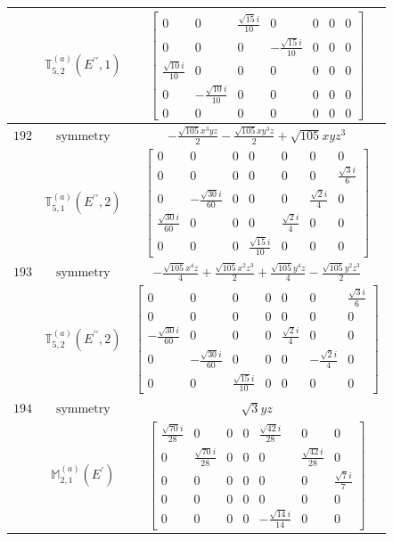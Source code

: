 \documentclass[fleqn,8pt,landscape]{jsarticle}
\begin{document}
\begin{longtable}{ccc}
$  $ & $ \mathbb{T}_{5,2}^{(a)}(E^{\prime\prime},1) $ & $ \begin{bmatrix} 0 & 0 & \frac{\sqrt{15} i}{10} & 0 & 0 & 0 & 0 \\ 0 & 0 & 0 & - \frac{\sqrt{15} i}{10} & 0 & 0 & 0 \\ \frac{\sqrt{10} i}{10} & 0 & 0 & 0 & 0 & 0 & 0 \\ 0 & - \frac{\sqrt{10} i}{10} & 0 & 0 & 0 & 0 & 0 \\ 0 & 0 & 0 & 0 & 0 & 0 & 0 \end{bmatrix} $ \\ \hline
$ 192 $ & $ \text{symmetry} $ & $ - \frac{\sqrt{105} x^{3} y z}{2} - \frac{\sqrt{105} x y^{3} z}{2} + \sqrt{105} x y z^{3} $ \\
$  $ & $ \mathbb{T}_{5,1}^{(a)}(E^{\prime\prime},2) $ & $ \begin{bmatrix} 0 & 0 & 0 & 0 & 0 & 0 & 0 \\ 0 & 0 & 0 & 0 & 0 & 0 & \frac{\sqrt{3} i}{6} \\ 0 & - \frac{\sqrt{30} i}{60} & 0 & 0 & 0 & \frac{\sqrt{2} i}{4} & 0 \\ \frac{\sqrt{30} i}{60} & 0 & 0 & 0 & \frac{\sqrt{2} i}{4} & 0 & 0 \\ 0 & 0 & 0 & \frac{\sqrt{15} i}{10} & 0 & 0 & 0 \end{bmatrix} $ \\ \hline
$ 193 $ & $ \text{symmetry} $ & $ - \frac{\sqrt{105} x^{4} z}{4} + \frac{\sqrt{105} x^{2} z^{3}}{2} + \frac{\sqrt{105} y^{4} z}{4} - \frac{\sqrt{105} y^{2} z^{3}}{2} $ \\
$  $ & $ \mathbb{T}_{5,2}^{(a)}(E^{\prime\prime},2) $ & $ \begin{bmatrix} 0 & 0 & 0 & 0 & 0 & 0 & \frac{\sqrt{3} i}{6} \\ 0 & 0 & 0 & 0 & 0 & 0 & 0 \\ - \frac{\sqrt{30} i}{60} & 0 & 0 & 0 & \frac{\sqrt{2} i}{4} & 0 & 0 \\ 0 & - \frac{\sqrt{30} i}{60} & 0 & 0 & 0 & - \frac{\sqrt{2} i}{4} & 0 \\ 0 & 0 & \frac{\sqrt{15} i}{10} & 0 & 0 & 0 & 0 \end{bmatrix} $ \\ \hline
$ 194 $ & $ \text{symmetry} $ & $ \sqrt{3} y z $ \\
$  $ & $ \mathbb{M}_{2,1}^{(a)}(E^{\prime}) $ & $ \begin{bmatrix} \frac{\sqrt{70} i}{28} & 0 & 0 & 0 & \frac{\sqrt{42} i}{28} & 0 & 0 \\ 0 & \frac{\sqrt{70} i}{28} & 0 & 0 & 0 & \frac{\sqrt{42} i}{28} & 0 \\ 0 & 0 & 0 & 0 & 0 & 0 & \frac{\sqrt{7} i}{7} \\ 0 & 0 & 0 & 0 & 0 & 0 & 0 \\ 0 & 0 & 0 & 0 & - \frac{\sqrt{14} i}{14} & 0 & 0 \end{bmatrix} $ \\ \hline

\end{longtable}
\end{document}
